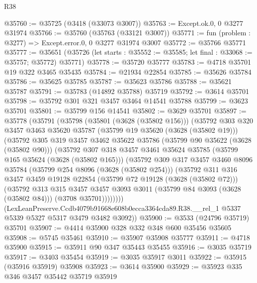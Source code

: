 \begin{lexlean}{R38}
\begin{coremodule}
@35760 := @35725 (@3418 (@33073 @3007))
@35763 := Except.ok.{0, 0} @3277 @31974
@35766 := @35760 (@35763 (@33121 @3007))
@35771 := fun (problem : @3277) => Except.error.{0, 0} @3277 @31974 @3007
@35772 := @35766 @35771
@35777 := @35651
    (@35726 (let starts : @35552 := @35585; let final : @33068 := @35757; @35772) @35771)
@35778 := @35720 @35777
@35783 := @4718 @35701 @19 @322 @3465 @35435
@35784 := @21934 @22854
@35785 := @35626 @35784
@35786 := @35625 @35785
@35787 := @35623 @35786
@35788 := @35621 @35787
@35791 := @35783 (@14892 @35788) @35719
@35792 := @3614 @35701
@35798 := @35792 @301 @321 @3457 @3464 @14541 @35788
@35799 := @3623 @35701
@35801 := @35799 @156 @14541
@35802 := @3629 @35701
@35897 := @35778
    (@35791
      (@35798
        (@35801 (@3628 (@35802 @156)))
        (@35792
          @303
          @320
          @3457
          @3463
          @35620
          @35787
          (@35799 @19 @35620 (@3628 (@35802 @19)))
          (@35792
            @305
            @319
            @3457
            @3462
            @35622
            @35786
            (@35799 @90 @35622 (@3628 (@35802 @90)))
            (@35792
              @307
              @318
              @3457
              @3461
              @35624
              @35785
              (@35799 @165 @35624 (@3628 (@35802 @165)))
              (@35792
                @309
                @317
                @3457
                @3460
                @8096
                @35784
                (@35799 @254 @8096 (@3628 (@35802 @254)))
                (@35792
                  @311
                  @316
                  @3457
                  @3459
                  @19128
                  @22854
                  (@35799 @72 @19128 (@3628 (@35802 @72)))
                  (@35792
                    @313
                    @315
                    @3457
                    @3457
                    @3093
                    @3011
                    (@35799 @84 @3093 (@3628 (@35802 @84)))
                    (@3708 @35701))))))))
      (LexLeanPreserve.Ccdb4079b91668e608b0ecca3364cda89.R38.__rel_1
        @5337
        @5339
        @5327
        @5317
        @3479
        @3482
        @3092))
@35900 := @3533 (@24796 @35719) @35701
@35907 := @4414 @35900 @328 @332 @348 @600 @35456 @35605
@35908 := @5745 @35461
@35910 := @35907 @35908 @35777
@35911 := @4718 @35900
@35915 := @35911 @90 @347 @35443 @35455
@35916 := @3035 @35719
@35917 := @3403 @35454
@35919 := @3035 @35917 @3011
@35922 := @35915 (@35916 @35919) @35908
@35923 := @3614 @35900
@35929 := @35923 @335 @346 @3457 @35442 @35719 @35919

\end{coremodule}
\end{lexlean}
